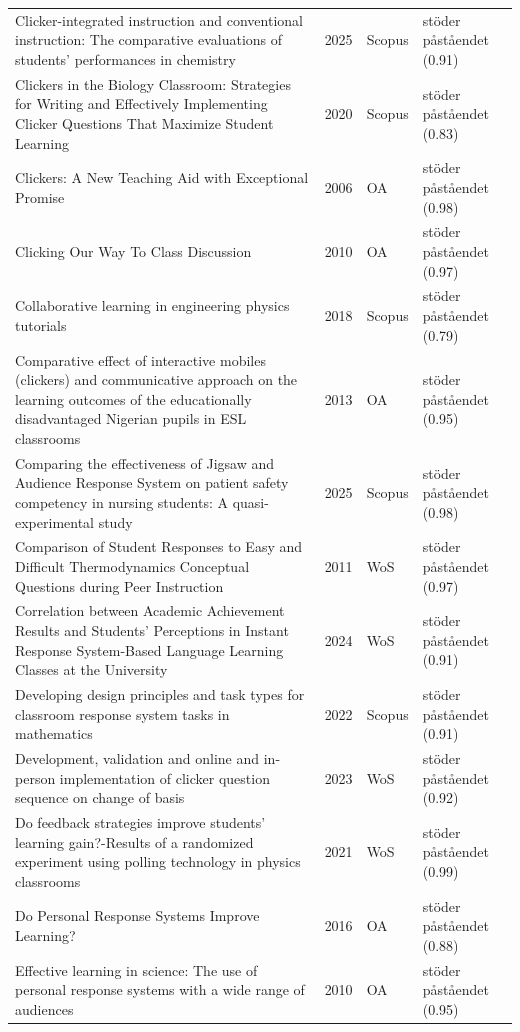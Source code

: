 \begin{longtable}{@{}%
  >{\raggedright\arraybackslash}p{}c%
  >{\raggedright\arraybackslash}p{}%
  >{\raggedright\arraybackslash}p{}@{}}
Clicker-integrated instruction and conventional instruction: The comparative evaluations of students' performances in chemistry & 2025 & Scopus & stöder påståendet (0.91) \\
Clickers in the Biology Classroom: Strategies for Writing and Effectively Implementing Clicker Questions That Maximize Student Learning & 2020 & Scopus & stöder påståendet (0.83) \\
Clickers: A New Teaching Aid with Exceptional Promise & 2006 & OA & stöder påståendet (0.98) \\
Clicking Our Way To Class Discussion & 2010 & OA & stöder påståendet (0.97) \\
Collaborative learning in engineering physics tutorials & 2018 & Scopus & stöder påståendet (0.79) \\
Comparative effect of interactive mobiles (clickers) and communicative approach on the learning outcomes of the educationally disadvantaged Nigerian pupils in ESL classrooms & 2013 & OA & stöder påståendet (0.95) \\
Comparing the effectiveness of Jigsaw and Audience Response System on patient safety competency in nursing students: A quasi-experimental study & 2025 & Scopus & stöder påståendet (0.98) \\
Comparison of Student Responses to Easy and Difficult Thermodynamics Conceptual Questions during Peer Instruction & 2011 & WoS & stöder påståendet (0.97) \\
Correlation between Academic Achievement Results and Students' Perceptions in Instant Response System-Based Language Learning Classes at the University & 2024 & WoS & stöder påståendet (0.91) \\
Developing design principles and task types for classroom response system tasks in mathematics & 2022 & Scopus & stöder påståendet (0.91) \\
Development, validation and online and in-person implementation of clicker question sequence on change of basis & 2023 & WoS & stöder påståendet (0.92) \\
Do feedback strategies improve students' learning gain?-Results of a randomized experiment using polling technology in physics classrooms & 2021 & WoS & stöder påståendet (0.99) \\
Do Personal Response Systems Improve Learning? & 2016 & OA & stöder påståendet (0.88) \\
Effective learning in science: The use of personal response systems with a wide range of audiences & 2010 & OA & stöder påståendet (0.95) \\

\end{longtable}
